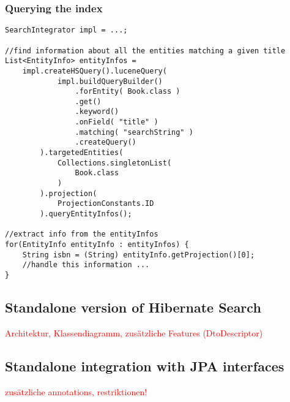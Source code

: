\subsubsection{Querying the index}

\lstset{language=java}
\begin{lstlisting}[frame=htrbl, caption={Querying the index}, label={lst:querying_natively.java}]
SearchIntegrator impl = ...;

//find information about all the entities matching a given title
List<EntityInfo> entityInfos = 
	impl.createHSQuery().luceneQuery( 
			impl.buildQueryBuilder()
				.forEntity( Book.class )
				.get()
				.keyword()
				.onField( "title" )
				.matching( "searchString" )
				.createQuery()
		).targetedEntities(
			Collections.singletonList(
				Book.class
			)
		).projection(
			ProjectionConstants.ID
		).queryEntityInfos();

//extract info from the entityInfos
for(EntityInfo entityInfo : entityInfos) {
	String isbn = (String) entityInfo.getProjection()[0];
	//handle this information ...
}
\end{lstlisting}

\subsection{Standalone version of Hibernate Search}

\textcolor{red}{Architektur, Klassendiagramm, zusätzliche Features (DtoDescriptor)}

\subsection{Standalone integration with JPA interfaces}

\textcolor{red}{zusätzliche annotations, restriktionen!}

\pagebreak